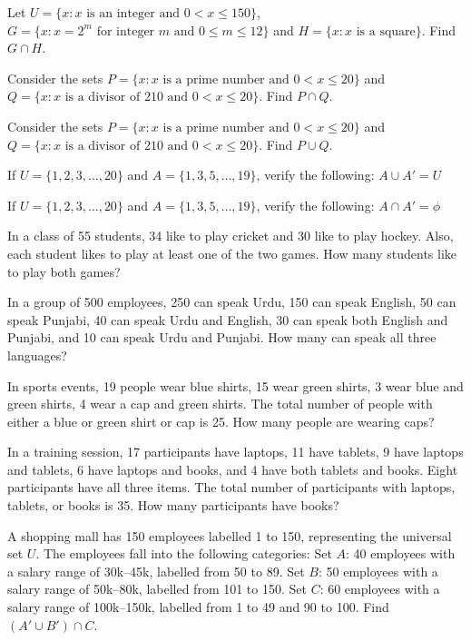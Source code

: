 \documentclass[11pt]{article}
\begin{document}
\begin{wq}[start=56]

\item Let $U=\{x: x \text{ is an integer and } 0<x\le 150\}$, $G=\{x: x=2^m \text{ for integer } m \text{ and } 0\le m\le 12\}$ and $H=\{x: x \text{ is a square}\}$. Find $G\cap H$.

\item Consider the sets $P=\{x: x \text{ is a prime number and } 0<x\le 20\}$ and $Q=\{x: x \text{ is a divisor of } 210 \text{ and } 0<x\le 20\}$. Find $P\cap Q$.

\item Consider the sets $P=\{x: x \text{ is a prime number and } 0<x\le 20\}$ and $Q=\{x: x \text{ is a divisor of } 210 \text{ and } 0<x\le 20\}$. Find $P\cup Q$.

\item If $U=\{1,2,3,\ldots,20\}$ and $A=\{1,3,5,\ldots,19\}$, verify the following: $A\cup A'=U$

\item If $U=\{1,2,3,\ldots,20\}$ and $A=\{1,3,5,\ldots,19\}$, verify the following: $A\cap A'=\phi$

\item In a class of 55 students, 34 like to play cricket and 30 like to play hockey. Also, each student likes to play at least one of the two games. How many students like to play both games?

\item In a group of 500 employees, 250 can speak Urdu, 150 can speak English, 50 can speak Punjabi, 40 can speak Urdu and English, 30 can speak both English and Punjabi, and 10 can speak Urdu and Punjabi. How many can speak all three languages?

\item In sports events, 19 people wear blue shirts, 15 wear green shirts, 3 wear blue and green shirts, 4 wear a cap and green shirts. The total number of people with either a blue or green shirt or cap is 25. How many people are wearing caps?

\item In a training session, 17 participants have laptops, 11 have tablets, 9 have laptops and tablets, 6 have laptops and books, and 4 have both tablets and books. Eight participants have all three items. The total number of participants with laptops, tablets, or books is 35. How many participants have books?

\item A shopping mall has 150 employees labelled 1 to 150, representing the universal set $U$. The employees fall into the following categories: Set $A$: 40 employees with a salary range of 30k--45k, labelled from 50 to 89. Set $B$: 50 employees with a salary range of 50k--80k, labelled from 101 to 150. Set $C$: 60 employees with a salary range of 100k--150k, labelled from 1 to 49 and 90 to 100. Find $(A'\cup B')\cap C$.


\end{wq}
\end{document}
